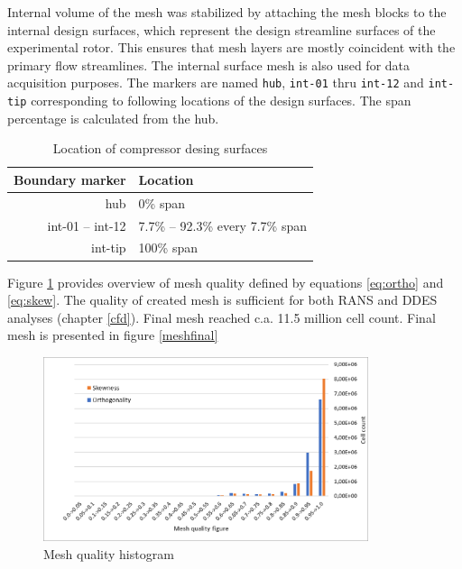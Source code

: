 Internal volume of the mesh was stabilized by attaching the mesh blocks to the internal design surfaces, which represent the design streamline surfaces of the experimental rotor. This ensures that mesh layers are mostly coincident with the primary flow streamlines. The internal surface mesh is also used for data acquisition purposes. The markers are named \texttt{hub}, \texttt{int-01} thru \texttt{int-12} and \texttt{int-tip} corresponding to following locations of the design surfaces. The span percentage is calculated from the hub.

\begin{table}[htb!]
\centering
\caption{Location of compressor desing surfaces} \label{tab:surfs}
\ttfamily
\begin{tabular}{@{}rl@{}}
\toprule
Boundary marker & Location \\ \midrule
hub & 0\% span  \\
int-01 -- int-12 & 7.7\% -- 92.3\% every 7.7\% span \\
int-tip & 100\% span \\
\bottomrule
\end{tabular}
\end{table}

Figure \ref{mesh-ortho} provides overview of mesh quality defined by equations \ref{eq:ortho} and \ref{eq:skew}. The quality of created mesh is sufficient for both RANS and DDES analyses (chapter \ref{cfd}). Final mesh reached c.a. 11.5 million cell count. Final mesh is presented in figure \ref{meshfinal} 

\begin{figure}[h!]
\centering %
\includegraphics[width=0.85\textwidth]{Pictures/mesh_ortho.png}
\caption{Mesh quality histogram}
\label{mesh-ortho}
\end{figure}

